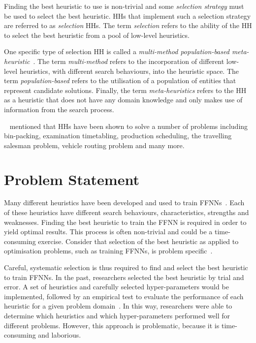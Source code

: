 Finding the best heuristic to use is non-trivial and some \textit{selection strategy} must be used to select the best heuristic. \acp{HH} that implement such a selection strategy are referred to as \textit{selection} \acp{HH}. The term \textit{selection} refers to the ability of the \acs{HH} to select the best heuristic from a pool of low-level heuristics.

One specific type of selection \acs{HH} is called a \textit{multi-method population-based meta-heuristic}~\cite{ref:vanderstockt:2018}. The term \textit{multi-method} refers to the incorporation of different low-level heuristics, with different search behaviours, into the heuristic space. The term \textit{population-based} refers to the utilisation of a population of entities that represent candidate solutions. Finally, the term \textit{meta-heuristics} refers to the \acs{HH} as a heuristic that does not have any domain knowledge and only makes use of information from the search process.

\citeauthor{ref:grobler:2015}~\cite{ref:grobler:2015} mentioned that \acp{HH} have been shown to solve a number of problems including bin-packing, examination timetabling, production scheduling, the travelling salesman problem, vehicle routing problem and many more.

\section{Problem Statement}\label{sec:introduction:problem}

Many different heuristics have been developed and used to train \acp{FFNN}~\cite{ref:gudise:2003, ref:rakitianskaia:2012, ref:montana:1989}. Each of these heuristics have different search behaviours, characteristics, strengths and weaknesses. Finding the best heuristic to train the \acs{FFNN} is required in order to yield optimal results. This process is often non-trivial and could be a time-consuming exercise.  Consider that selection of the best heuristic as applied to optimisation problems, such as training \acp{FFNN}, is problem specific~\cite{ref:allen:1996, ref:drake:2020, ref:pillay:2018}.

Careful, systematic selection is thus required to find and select the best heuristic to train \acp{FFNN}. In the past, researchers selected the best heuristic by trial and error. A set of heuristics and carefully selected hyper-parameters would be implemented, followed by an empirical test to evaluate the performance of each heuristic for a given problem domain~\cite{ref:pillay:2015}. In this way, researchers were able to determine which heuristics and which hyper-parameters performed well for different problems. However, this approach is problematic, because it is time-consuming and laborious.

